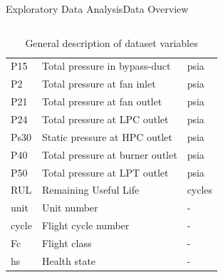 \documentclass{beamer}
\begin{document}
\begin{frame}{Exploratory Data Analysis}{Data Overview}
\begin{columns}
\begin{column}{0.6\textwidth}
\begin{table}[!htbp]
{\begin{tabular}{ |l|l|l| }
                            P15 & Total pressure in bypass-duct & psia \\
                            P2 & Total pressure at fan inlet & psia \\
                            P21 & Total pressure at fan outlet & psia \\
                            P24 & Total pressure at LPC outlet & psia \\
                            Ps30 & Static pressure at HPC outlet & psia \\
                            P40 & Total pressure at burner outlet & psia \\
                            P50 & Total pressure at LPT outlet & psia \\
                            \hline
                            RUL & Remaining Useful Life & cycles \\
                            \hline
                            unit & Unit number & - \\
                            cycle & Flight cycle number & - \\
                            Fc & Flight class & - \\
                            hs & Health state & - \\
                            \hline
                        \end{tabular}}
                        \label{tab:dataset_info}
                        \caption{General description of dataset variables  \cite{phm-conference}}
                    \end{table}
                \end{column}
            \end{columns}

        \end{frame}
\end{document}

